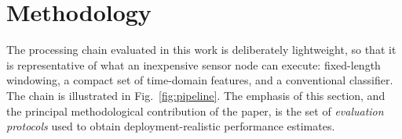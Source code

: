 
\section{Methodology}
\label{sec:method}

The processing chain evaluated in this work is deliberately lightweight, so that
it is representative of what an inexpensive sensor node can execute: fixed-length
windowing, a compact set of time-domain features, and a conventional classifier.
The chain is illustrated in Fig.~\ref{fig:pipeline}. The emphasis of this section,
and the principal methodological contribution of the paper, is the set of
\emph{evaluation protocols} used to obtain deployment-realistic performance
estimates.

